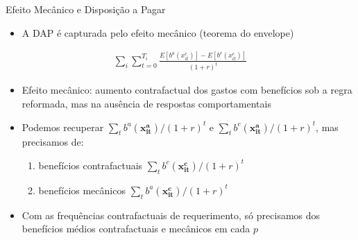 \begin{frame}[label=MEandFE]{Efeito Mecânico e Disposição a Pagar}
    \begin{itemize}
        \item A DAP é capturada pelo efeito mecânico (teorema do envelope)
    \end{itemize}
    {\small
    \begin{align*}
         \sum_i \sum_{t=0}^{T_i} \frac{E[b^a(x^c_{it})]-E[b^c(x_{it}^c)]}{(1+r)^t}
    \end{align*}
    }
    \begin{itemize}
        \item Efeito mecânico: aumento contrafactual dos gastos com benefícios sob a regra reformada, mas na ausência de respostas comportamentais
        \item Podemos recuperar $\sum_t b^a(\mathbf{x_{it}^a})/(1+r)^t$ e $\sum_t b^c(\mathbf{x_{it}^a})/(1+r)^t$, mas precisamos de:
        \begin{enumerate}
            \item benefícios contrafactuais $\sum_t b^c(\mathbf{x_{it}^c})/(1+r)^t$
            \item benefícios mecânicos $\sum_t b^a(\mathbf{x^c_{it}})/(1+r)^t$
        \end{enumerate}
        \item Com as frequências contrafactuais de requerimento, só precisamos dos benefícios médios contrafactuais e mecânicos em cada $p$
    \end{itemize}
\end{frame}

